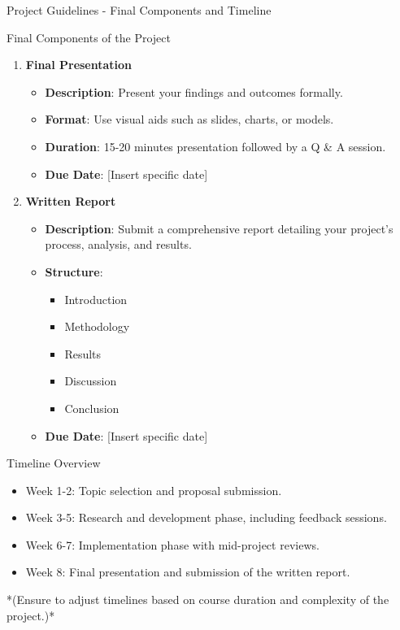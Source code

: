\documentclass[aspectratio=169]{beamer}
\begin{document}
\begin{frame}[fragile]{Project Guidelines - Final Components and Timeline}
    \begin{block}{Final Components of the Project}
        \begin{enumerate}[resume]
            \item \textbf{Final Presentation}
                \begin{itemize}
                    \item \textbf{Description}: Present your findings and outcomes formally.
                    \item \textbf{Format}: Use visual aids such as slides, charts, or models.
                    \item \textbf{Duration}: 15-20 minutes presentation followed by a Q \& A session.
                    \item \textbf{Due Date}: [Insert specific date]
                \end{itemize}
            \item \textbf{Written Report}
                \begin{itemize}
                    \item \textbf{Description}: Submit a comprehensive report detailing your project’s process, analysis, and results.
                    \item \textbf{Structure}:
                        \begin{itemize}
                            \item Introduction
                            \item Methodology
                            \item Results
                            \item Discussion
                            \item Conclusion
                        \end{itemize}
                    \item \textbf{Due Date}: [Insert specific date]
                \end{itemize}
        \end{enumerate}
    \end{block}
    
    \begin{block}{Timeline Overview}
        \begin{itemize}
            \item Week 1-2: Topic selection and proposal submission.
            \item Week 3-5: Research and development phase, including feedback sessions.
            \item Week 6-7: Implementation phase with mid-project reviews.
            \item Week 8: Final presentation and submission of the written report.
        \end{itemize}
        *(Ensure to adjust timelines based on course duration and complexity of the project.)*
    \end{block}
\end{frame}
\end{document}
